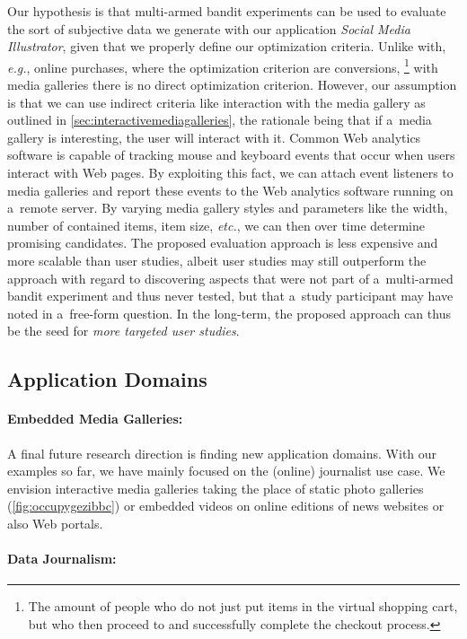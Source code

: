 Our hypothesis is that multi-armed bandit experiments can be used
to evaluate the sort of subjective data we generate
with our application \emph{Social Media Illustrator}, given that we
properly define our optimization criteria.
Unlike with, \emph{e.g.}, online purchases,
where the optimization criterion are conversions,%
\footnote{The amount of people who do not just put items in the virtual shopping cart,
but who then proceed to and successfully complete the checkout process.}
with media galleries there is no direct optimization criterion.
However, our assumption is that we can use indirect criteria like
interaction with the media gallery
as outlined in \autoref{sec:interactivemediagalleries},
the rationale being that if
a~media gallery is interesting, the user will interact with it.
Common Web analytics software is capable of tracking mouse and
keyboard events that occur when users interact with Web pages.
By exploiting this fact, we can attach event listeners
to media galleries and report these events
to the Web analytics software running on a~remote server.
By varying media gallery styles and parameters like the width,
number of contained items, item size, \emph{etc.},
we can then over time determine promising candidates.
The proposed evaluation approach is less expensive
and more scalable than user studies,
albeit user studies may still outperform the approach
with regard to discovering aspects that were not part
of a~multi-armed bandit experiment and thus never tested,
but that a~study participant may have noted in a~free-form question.
In the long-term, the proposed approach
can thus be the seed for \emph{more targeted user studies}.

\subsection{Application Domains}

\paragraph{Embedded Media Galleries:}

A final future research direction is finding new application domains.
With our examples so far, we have mainly focused
on the (online) journalist use case.
We envision interactive media galleries taking the place
of static photo galleries (\autoref{fig:occupygezibbc})
or embedded videos on online editions
of news websites or also Web portals.

\paragraph{Data Journalism:}

